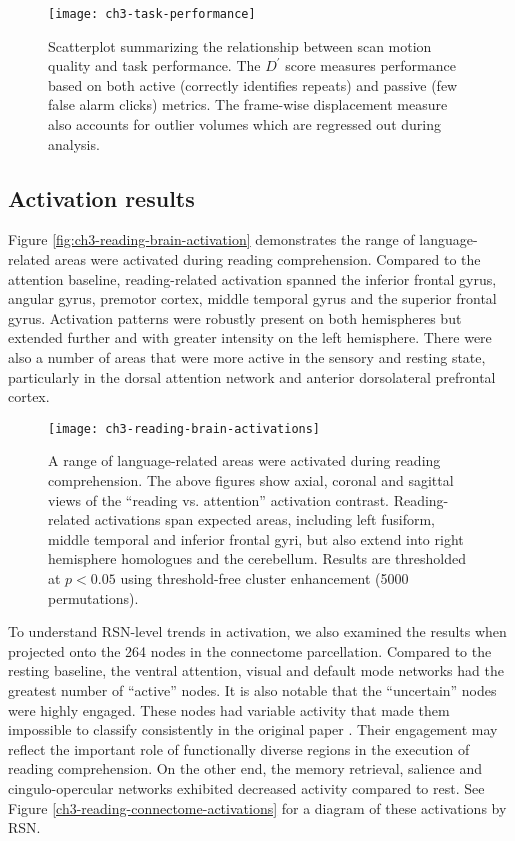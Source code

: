\begin{figure}[t]
	\centering
	\texttt{[image: ch3-task-performance]}
    \caption[Description of scan motion quality and task performance.]{Scatterplot summarizing the relationship between scan motion quality and task performance. The $D^\prime$ score measures performance based on both active (correctly identifies repeats) and passive (few false alarm clicks) metrics. The frame-wise displacement measure also accounts for outlier volumes which are regressed out during analysis.}
	\label{fig:ch3-task-performance}
\end{figure}

\subsection{Activation results}

Figure \ref{fig:ch3-reading-brain-activation} demonstrates the range of language-related areas were activated during reading comprehension. Compared to the attention baseline, reading-related activation spanned the inferior frontal gyrus, angular gyrus, premotor cortex, middle temporal gyrus and the superior frontal gyrus. Activation patterns were robustly present on both hemispheres but extended further and with greater intensity on the left hemisphere. There were also a number of areas that were more active in the sensory and resting state, particularly in the dorsal attention network and anterior dorsolateral prefrontal cortex.

\begin{figure}[t]
	\centering
	\texttt{[image: ch3-reading-brain-activations]}
    \caption[A range of language-related areas were activated during reading comprehension.]{A range of language-related areas were activated during reading comprehension. The above figures show axial, coronal and sagittal views of the ``reading vs. attention'' activation contrast. Reading-related activations span expected areas, including left fusiform, middle temporal and inferior frontal gyri, but also extend into right hemisphere homologues and the cerebellum. Results are thresholded at $p < 0.05$ using threshold-free cluster enhancement (5000 permutations).}
	\label{fig:ch3-reading-brain-activations}
\end{figure}

To understand RSN-level trends in activation, we also examined the results when projected onto the 264 nodes in the connectome parcellation. Compared to the resting baseline, the ventral attention, visual and default mode networks had the greatest number of ``active'' nodes. It is also notable that the ``uncertain'' nodes were highly engaged. These nodes had variable activity that made them impossible to classify consistently in the original paper \citep{Power2011}. Their engagement may reflect the important role of functionally diverse regions in the execution of reading comprehension. On the other end, the memory retrieval, salience and cingulo-opercular networks exhibited decreased activity compared to rest. See Figure \ref{ch3-reading-connectome-activations} for a diagram of these activations by RSN. 

